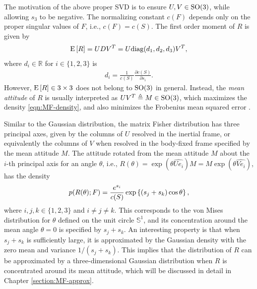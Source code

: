 The motivation of the above proper SVD is to ensure $U,V\in\mathrm{SO}(3)$, while allowing $s_3$ to be negative.
The normalizing constant $c(F)$ depends only on the proper singular values of $F$, i.e., $c(F) = c(S)$.
The first order moment of $R$ is given by 
\begin{gather} \label{eqn:MF-ER}
	\mathrm{E}\left[ R \right] = UDV^T = U\mathrm{diag}(d_1,d_2,d_3)V^T,
\end{gather}
where $d_i\in\mathbb{R}$ for $i\in\{1,2,3\}$ is
\begin{gather} \label{eqn:MF-S2D}
	d_i = \frac{1}{c(S)} \frac{\partial c(S)}{\partial s_i}.
\end{gather}
However, $\expect{R}\in\real{3\times 3}$  does not belong to $\mathrm{SO}(3)$ in general. 
Instead, the \textit{mean attitude} of $R$ is usually interpreted as $UV^T \triangleq M\in\mathrm{SO}(3)$, which maximizes the density \eqref{eqn:MF-density}, and also minimizes the Frobenius mean squared error \cite{lee2018bayesian}. 

Similar to the Gaussian distribution, the matrix Fisher distribution has three principal axes, given by the columns of $U$ resolved in the inertial frame, or equivalently the columns of $V$ when resolved in the body-fixed frame specified by the mean attitude $M$.
The attitude rotated from the mean attitude $M$ about the $i$-th principal axis for an angle $\theta$, i.e., $R(\theta) = \exp(\theta\widehat{Ue_i})M = M\exp(\theta\widehat{Ve_i})$, has the density
\begin{equation} \label{eqn:MF-density-principal}
	p(R(\theta);F) = \frac{e^{s_i}}{c(S)}\exp\left\{ (s_j+s_k)\cos\theta \right\},
\end{equation}
where $i,j,k\in\{1,2,3\}$ and $i\neq j\neq k$.
This corresponds to the von Mises distribution for $\theta$ defined on the unit circle $\mathbb{S}^1$, and its concentration around the mean angle $\theta=0$ is specified by $s_j+s_k$.
An interesting property is that when $s_j+s_k$ is sufficiently large, it is approximated by the Gaussian density with the zero mean and variance $1/(s_j+s_k)$.
This implies that the distribution of $R$ can be approximated by a three-dimensional Gaussian distribution when $R$ is concentrated around its mean attitude, which will be discussed in detail in Chapter \ref{section:MF-approx}.

